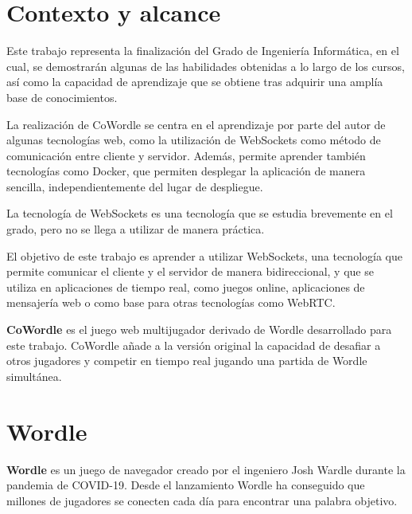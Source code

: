 \section{Contexto y alcance}

Este trabajo representa la finalización del Grado de Ingeniería Informática, en el cual, se demostrarán algunas de las habilidades obtenidas a lo largo de los cursos, así como la capacidad de aprendizaje que se obtiene tras adquirir una amplía base de conocimientos.

La realización de CoWordle se centra en el aprendizaje por parte del autor de algunas tecnologías web, como la utilización de WebSockets como método de comunicación entre cliente y servidor.  Además, permite aprender también tecnologías como Docker, que permiten desplegar la aplicación de manera sencilla, independientemente del lugar de despliegue.

La tecnología de WebSockets es una tecnología que se estudia brevemente en el grado, pero no se llega a utilizar de manera práctica.

El objetivo de este trabajo es aprender a utilizar WebSockets, una tecnología que permite comunicar el cliente y el servidor de manera bidireccional, y que se utiliza en aplicaciones de tiempo real, como juegos online, aplicaciones de mensajería web o como base para otras tecnologías como WebRTC.

\textbf{CoWordle} es el juego web multijugador derivado de Wordle desarrollado para este trabajo. CoWordle añade a la versión original la capacidad de desafiar a otros jugadores y competir en tiempo real jugando una partida de Wordle simultánea.


\section{Wordle}

\textbf{Wordle} es un juego de navegador creado por el ingeniero Josh Wardle durante la pandemia de COVID-19. Desde el lanzamiento Wordle ha conseguido que millones de jugadores se conecten cada día para encontrar una palabra objetivo.

